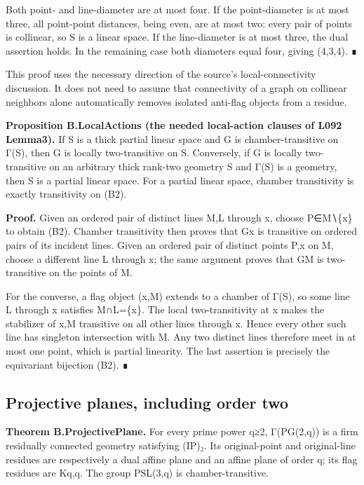 Both point- and line-diameter are at most four. If the point-diameter is
at most three, all point-point distances, being even, are at most two:
every pair of points is collinear, so S is a linear space. If the
line-diameter is at most three, the dual assertion holds. In the
remaining case both diameters equal four, giving (4,3,4). ∎

This proof uses the necessary direction of the source's
local-connectivity discussion. It does not need to assume that
connectivity of a graph on collinear neighbors alone automatically
removes isolated anti-flag objects from a residue.

\textbf{Proposition B.LocalActions (the needed local-action clauses of
L092 Lemma3).} If S is a thick partial linear space and G is
chamber-transitive on Γ(S), then G is locally two-transitive on S.
Conversely, if G is locally two-transitive on an arbitrary thick
rank-two geometry S and Γ(S) is a geometry, then S is a partial linear
space. For a partial linear space, chamber transitivity is exactly
transitivity on (B2).

\textbf{Proof.} Given an ordered pair of distinct lines M,L through x,
choose P∈M∖\{x\} to obtain (B2). Chamber transitivity then proves that
Gx is transitive on ordered pairs of its incident lines. Given an
ordered pair of distinct points P,x on M, choose a different line L
through x; the same argument proves that GM is two-transitive on the
points of M.

For the converse, a flag object (x,M) extends to a chamber of Γ(S), so
some line L through x satisfies M∩L=\{x\}. The local two-transitivity at
x makes the stabilizer of x,M transitive on all other lines through x.
Hence every other such line has singleton intersection with M. Any two
distinct lines therefore meet in at most one point, which is partial
linearity. The last assertion is precisely the equivariant bijection
(B2). ∎

\subsection{Projective planes, including order
two}\label{projective-planes-including-order-two}

\textbf{Theorem B.ProjectivePlane.} For every prime power q≥2,
Γ(PG(2,q)) is a firm residually connected geometry satisfying (IP)₂. Its
original-point and original-line residues are respectively a dual affine
plane and an affine plane of order q; its flag residues are Kq,q. The
group PSL(3,q) is chamber-transitive.

